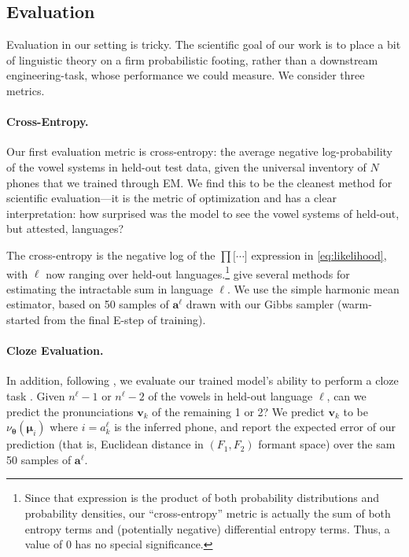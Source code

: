 \documentclass[11pt,a4paper]{article}
\renewcommand{\l}{^\ell}
\newcommand{\vtheta}{{\boldsymbol \theta}}
\newcommand{\vmu}{{\boldsymbol \mu}}
\newcommand{\vv}{{\mathbf{v}}}
\newcommand{\va}{{\mathbf{a}}}
\newcommand{\NN}{\nu_{\vtheta}}
\begin{document}
\subsection{Evaluation}
Evaluation in our setting is tricky. The scientific
goal of our work is to place a bit of linguistic theory on
a firm probabilistic footing, rather than a downstream
engineering-task, whose performance we could measure.
We consider three metrics.

\paragraph{Cross-Entropy.}
Our first evaluation metric is cross-entropy: the average negative
log-probability of the vowel systems in held-out test data, given the
universal inventory of $N$ phones that we trained through EM.  We find
this to be the cleanest method for scientific evaluation---it is the
metric of optimization and has a clear interpretation: how surprised
was the model to see the vowel systems of held-out, but attested,
languages?

The cross-entropy is the negative log of the
$\prod \big[ \cdots \big]$ expression in \cref{eq:likelihood}, with
$\ell$ now ranging over held-out languages.\footnote{Since that
  expression is the product of both probability distributions and
  probability densities, our ``cross-entropy'' metric is actually the sum of
  both entropy terms and (potentially negative) differential entropy
  terms.  Thus, a value of 0 has no special significance.}
 give several methods for estimating
the intractable sum in language $\ell$.  We use the simple harmonic mean estimator, based
on 50 samples of $\va\l$ drawn with our Gibbs sampler (warm-started from the
final E-step of training).

\paragraph{Cloze Evaluation.}
In addition, following , we evaluate
our trained model's ability to perform a cloze task
\cite{taylor1953cloze}.  Given $n\l-1$ or $n\l-2$ of the vowels in
held-out language $\ell$, can we predict the pronunciations $\vv_k$ of
the remaining 1 or 2?  We predict $\vv_k$ to be $\NN(\vmu_i)$ where
$i = a\l_k$ is the inferred phone, and report the expected error of
our prediction (that is, Euclidean distance in $(F_1,F_2)$ formant
space) over the sam 50 samples of $\va\l$.
\end{document}
